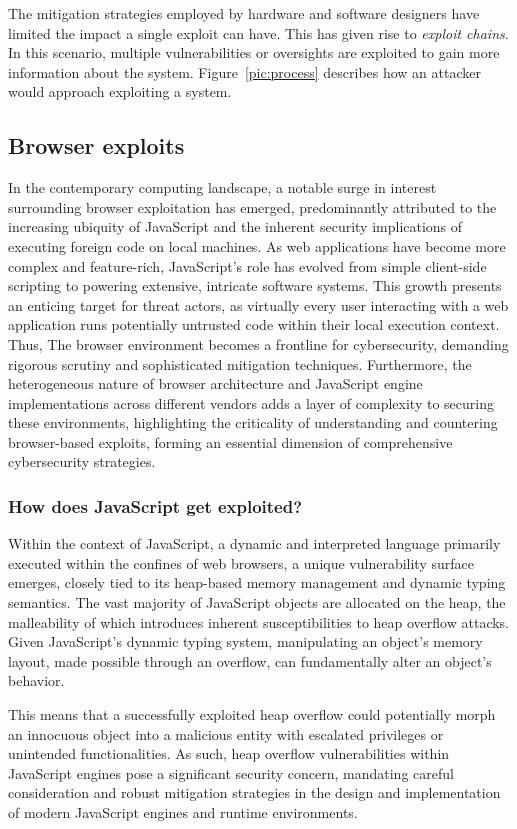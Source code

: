 \documentclass{article}
\begin{document}
The mitigation strategies employed by hardware and software designers have limited the impact a single exploit can have. This has given rise to \emph{exploit chains}. In this scenario, multiple vulnerabilities or oversights are exploited to gain more information about the system. Figure~\ref{pic:process} describes how an attacker would approach exploiting a system.

\subsection{Browser exploits}
In the contemporary computing landscape, a notable surge in interest surrounding browser exploitation has emerged, predominantly attributed to the increasing ubiquity of JavaScript and the inherent security implications of executing foreign code on local machines. As web applications have become more complex and feature-rich, JavaScript's role has evolved from simple client-side scripting to powering extensive, intricate software systems. This growth presents an enticing target for threat actors, as virtually every user interacting with a web application runs potentially untrusted code within their local execution context. Thus, The browser environment becomes a frontline for cybersecurity, demanding rigorous scrutiny and sophisticated mitigation techniques. Furthermore, the heterogeneous nature of browser architecture and JavaScript engine implementations across different vendors adds a layer of complexity to securing these environments, highlighting the criticality of understanding and countering browser-based exploits, forming an essential dimension of comprehensive cybersecurity strategies.

\subsubsection{How does JavaScript get exploited?}
Within the context of JavaScript, a dynamic and interpreted language primarily executed within the confines of web browsers, a unique vulnerability surface emerges, closely tied to its heap-based memory management and dynamic typing semantics. The vast majority of JavaScript objects are allocated on the heap, the malleability of which introduces inherent susceptibilities to heap overflow attacks. Given JavaScript's dynamic typing system, manipulating an object's memory layout, made possible through an overflow, can fundamentally alter an object's behavior.


This means that a successfully exploited heap overflow could potentially morph an innocuous object into a malicious entity with escalated privileges or unintended functionalities. As such, heap overflow vulnerabilities within JavaScript engines pose a significant security concern, mandating careful consideration and robust mitigation strategies in the design and implementation of modern JavaScript engines and runtime environments.
\end{document}
